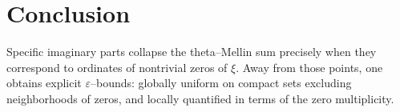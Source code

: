 \documentclass[12pt]{article}
\begin{document}
\section{Conclusion}
Specific imaginary parts collapse the theta--Mellin sum precisely when they correspond to ordinates of nontrivial zeros of $\xi$. Away from those points, one obtains explicit $\varepsilon$--bounds: globally uniform on compact sets excluding neighborhoods of zeros, and locally quantified in terms of the zero multiplicity.
\end{document}
